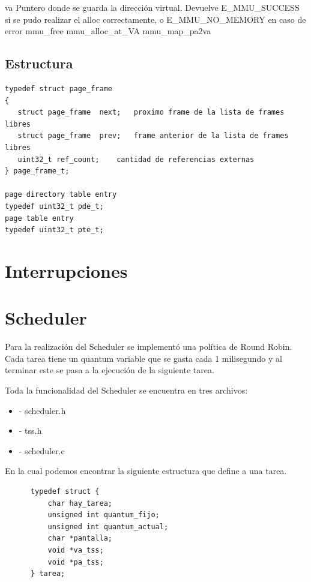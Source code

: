 \documentclass[a4paper,10pt]{article}
\begin{document}
     va  Puntero donde se guarda la dirección virtual.
     Devuelve E\_MMU\_SUCCESS si se pudo realizar el alloc correctamente, o E\_MMU\_NO\_MEMORY en caso de error
     mmu\_free
     mmu\_alloc\_at\_VA
     mmu\_map\_pa2va
   
\subsection*{Estructura}
\begin{verbatim}
typedef struct page_frame
{
   struct page_frame  next;   proximo frame de la lista de frames libres
   struct page_frame  prev;   frame anterior de la lista de frames libres
   uint32_t ref_count;    cantidad de referencias externas
} page_frame_t;

page directory table entry
typedef uint32_t pde_t; 
page table entry
typedef uint32_t pte_t;
\end{verbatim}

\section*{Interrupciones}


\section*{Scheduler}

Para la realizaci\'on del Scheduler se implement\'o una pol\'itica de Round Robin. Cada tarea tiene un quantum variable que se gasta cada 1 milisegundo y al terminar este se pasa a la ejecuci\'on de la siguiente tarea.

Toda la funcionalidad del Scheduler se encuentra en tres archivos:
\begin{itemize}
\item	- scheduler.h
\item	- tss.h
\item	- scheduler.c
\end{itemize}

En la cual podemos encontrar la siguiente estructura que define a una tarea.

\begin{verbatim}
      typedef struct {
          char hay_tarea;						
          unsigned int quantum_fijo;			
          unsigned int quantum_actual;		
          char *pantalla;					
          void *va_tss;						
          void *pa_tss;						
      } tarea;
\end{verbatim}
\end{document}
